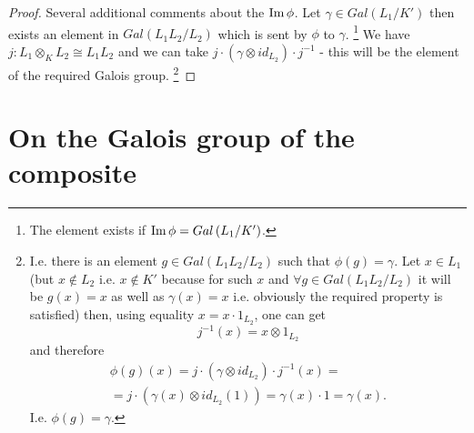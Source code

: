 \begin{theorem}
\begin{proof}
    Several additional comments about the $\operatorname{Im} \phi$.
    Let $\gamma \in Gal\left(L_1/K'\right)$ then exists an element in
    $Gal\left(L_1 L_2/L_2\right)$ which is sent by $\phi$ to $\gamma$.
    \footnote{
      The element exists if $\operatorname{Im} \phi = Gal\left(L_1/K'\right)$.
    }
    We have $j: L_1 \otimes_K L_2 \cong L_1 L_2$ and we can take
    $j \cdot \left(\gamma \otimes id_{L_2}\right) \cdot j^{-1}$ - this will
    be the element of the required Galois group.
    \footnote{
      I.e. there is an element $g \in Gal\left(L_1 L_2/L_2\right)$
      such that $\phi(g) = \gamma$. Let $x \in L_1$
      (but $x \notin L_2$ i.e. $x \notin K'$ because for such $x$ and
      $\forall g \in Gal\left(L_1 L_2/L_2\right)$ it will be
      $g(x) = x$ as well as $\gamma(x) = x$
      i.e. obviously the required property is satisfied)
      then, using equality $x = x \cdot 1_{L_2}$, one can get
      \[
      j^{-1}(x) = x \otimes 1_{L_2}
      \]
      and therefore
      \begin{eqnarray}
        \phi(g)(x) = j \cdot \left(\gamma \otimes id_{L_2}\right) \cdot
        j^{-1} (x) =
        \nonumber \\
        = j \cdot \left(\gamma(x) \otimes id_{L_2}(1)\right) =
        \gamma(x) \cdot 1 = \gamma(x).
        \nonumber
      \end{eqnarray}
      I.e. $\phi(g) = \gamma$.
    }
  \end{proof}
\end{theorem}

\section{On the Galois group of the composite}

